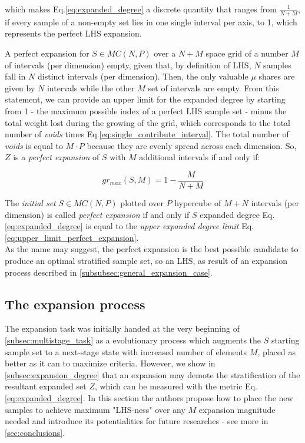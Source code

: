 \documentclass[12pt]{extarticle}
\newcommand{\meqref}[1]{Eq.\ref{#1}}
\begin{document}
which makes \meqref{eq:expanded_degree} a discrete quantity that ranges from $\frac{1}{N+M}$, if every sample of a non-empty set lies in one single interval per axis, to 1, which represents the perfect LHS expansion.

A perfect expansion for $S \in MC(N, P)$ over a $N+M$ space grid of a number $M$ of intervals (per dimension) empty, given that, by definition of LHS, $N$ samples fall in $N$ distinct intervals (per dimension). Then, the only valuable \textbf{$\mu$} shares are given by $N$ intervals while the other $M$ set of intervals are empty. From this statement, we can provide an upper limit for the expanded degree by starting from 1 - the maximum possible index of a perfect LHS sample set - minus the total weight lost during the growing of the grid, which corresponds to the total number of \textit{voids} times \meqref{eq:single_contribute_interval}. The total number of \textit{voids} is equal to $M \cdot P$ because they are evenly spread across each dimension. So, $Z$ is a \textit{perfect expansion} of $S$ with $M$ additional intervals if and only if:

\begin{equation}
\label{eq:upper_limit_perfect_expansion}
gr_{max}(S, M) = 1 - \frac{M}{N+M}
\end{equation}

The \textit{initial set} $S \in MC(N, P)$ plotted over $P$ hypercube of $M+N$ intervals (per dimension) is called \textit{perfect expansion} if and only if $S$ expanded degree \meqref{eq:expanded_degree} is equal to the \textit{upper expanded degree limit} \meqref{eq:upper_limit_perfect_expansion}. \\
As the name may suggest, the perfect expansion is the best possible candidate to produce an optimal stratified sample set, so an LHS, as result of an expansion process described in \cref{subsubsec:general_expansion_case}.


\subsection{The expansion process}
The expansion task was initially handed at the very beginning of  \cref{subsec:multistage_task} as a evolutionary process which augments the $S$ starting sample set to a next-stage state with increased number of elements $M$, placed as better as it can to maximize criteria. However, we show in \cref{subsec:expansion_degree} that an expansion may demote the stratification of the resultant expanded set $Z$, which can be measured with the metric \meqref{eq:expanded_degree}. 
In this section the authors propose how to place the new samples to achieve maximum "LHS-ness" over any $M$ expansion magnitude needed and introduce its potentialities for future researches - see more in \cref{sec:conclusions}.
\end{document}
